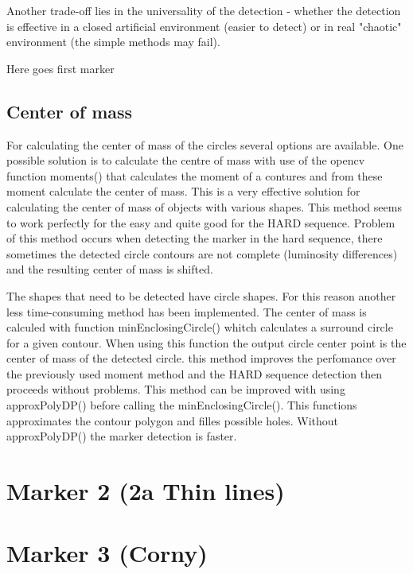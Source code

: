 Another trade-off lies in the universality of the detection - whether the detection is effective in a closed artificial environment (easier to detect) or in real "chaotic" environment (the simple methods may fail).

\newpage

Here goes first marker


\subsection{Center of mass}
For calculating the center of mass of the circles several options are available.
One possible solution is to calculate the centre of mass with use of the opencv function
moments() that calculates the moment of a contures and from these moment calculate the
center of mass. This is a very effective solution for calculating the center of mass of
objects with various shapes. This method seems to work perfectly for the easy and quite good
for the HARD sequence. Problem of this method occurs when detecting the marker in the hard sequence,
there sometimes the detected circle contours are not complete (luminosity differences) and the resulting
center of mass is shifted. 

The shapes that need to be detected have circle shapes. For this reason another less time-consuming 
method has been implemented. The center of mass is calculed with function minEnclosingCircle() whitch calculates
a surround circle for a given contour. When using this function the output circle center point is the
center of mass of the detected circle. this method improves the perfomance over the previously used 
moment method and the HARD sequence detection then proceeds without problems. This method can be improved 
with using approxPolyDP() before calling the minEnclosingCircle(). This functions approximates the contour
polygon and filles possible holes. Without approxPolyDP() the marker detection is faster.
\newpage
\section{Marker 2 (2a Thin lines)}

\newpage
\section{Marker 3 (Corny)}
